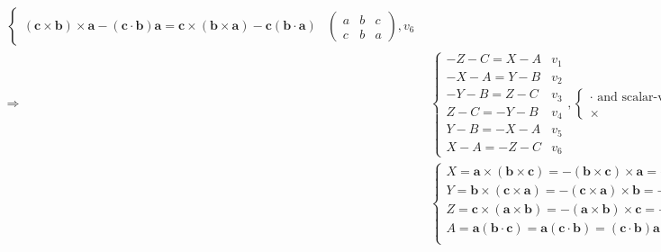 \documentclass[
]{book}
\theoremstyle{definition}
\theoremstyle{definition}
\theoremstyle{definition}
\theoremstyle{definition}
\theoremstyle{remark}
\begin{document}
\[\begin{aligned}
\begin{cases}
\left(\boldsymbol{c}\times\boldsymbol{b}\right)\times\boldsymbol{a}-\left(\boldsymbol{c}\cdot\boldsymbol{b}\right)\boldsymbol{a}=\boldsymbol{c}\times\left(\boldsymbol{b}\times\boldsymbol{a}\right)-\boldsymbol{c}\left(\boldsymbol{b}\cdot\boldsymbol{a}\right) & \begin{pmatrix}a & b & c\\
c & b & a
\end{pmatrix},v_{{\scriptscriptstyle 6}}
\end{cases}\\
\Rightarrow & \begin{cases}
-Z-C=X-A & v_{{\scriptscriptstyle 1}}\\
-X-A=Y-B & v_{{\scriptscriptstyle 2}}\\
-Y-B=Z-C & v_{{\scriptscriptstyle 3}}\\
Z-C=-Y-B & v_{{\scriptscriptstyle 4}}\\
Y-B=-X-A & v_{{\scriptscriptstyle 5}}\\
X-A=-Z-C & v_{{\scriptscriptstyle 6}}
\end{cases},\begin{cases}
\cdot\text{ and scalar-vector product} & \text{commutative}\\
\times & \text{anticommutative}
\end{cases},\\
 & \begin{cases}
X=\boldsymbol{a}\times\left(\boldsymbol{b}\times\boldsymbol{c}\right)=-\left(\boldsymbol{b}\times\boldsymbol{c}\right)\times\boldsymbol{a}=-\boldsymbol{a}\times\left(\boldsymbol{c}\times\boldsymbol{b}\right)=\left(\boldsymbol{c}\times\boldsymbol{b}\right)\times\boldsymbol{a}\\
Y=\boldsymbol{b}\times\left(\boldsymbol{c}\times\boldsymbol{a}\right)=-\left(\boldsymbol{c}\times\boldsymbol{a}\right)\times\boldsymbol{b}=-\boldsymbol{b}\times\left(\boldsymbol{a}\times\boldsymbol{c}\right)=\left(\boldsymbol{a}\times\boldsymbol{c}\right)\times\boldsymbol{b}\\
Z=\boldsymbol{c}\times\left(\boldsymbol{a}\times\boldsymbol{b}\right)=-\left(\boldsymbol{a}\times\boldsymbol{b}\right)\times\boldsymbol{c}=-\boldsymbol{c}\times\left(\boldsymbol{b}\times\boldsymbol{a}\right)=\left(\boldsymbol{b}\times\boldsymbol{a}\right)\times\boldsymbol{c}\\
A=\boldsymbol{a}\left(\boldsymbol{b}\cdot\boldsymbol{c}\right)=\boldsymbol{a}\left(\boldsymbol{c}\cdot\boldsymbol{b}\right)=\left(\boldsymbol{c}\cdot\boldsymbol{b}\right)\boldsymbol{a}=\left(\boldsymbol{b}\cdot\boldsymbol{c}\right)\boldsymbol{a}\\

\end{cases}
\end{aligned}\]
\end{document}
